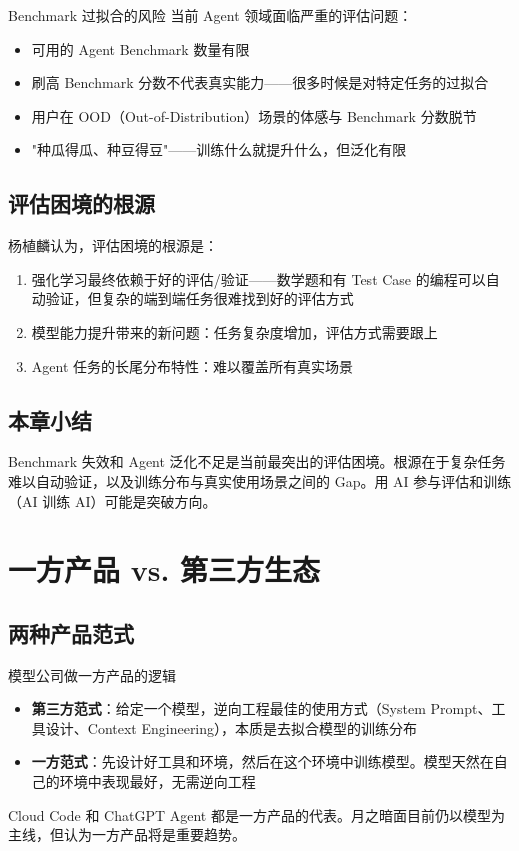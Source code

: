 \documentclass[a4paper]{article}
\begin{document}
\begin{warningbox}{Benchmark 过拟合的风险}
当前 Agent 领域面临严重的评估问题：
\begin{itemize}
    \item 可用的 Agent Benchmark 数量有限
    \item 刷高 Benchmark 分数不代表真实能力——很多时候是对特定任务的过拟合
    \item 用户在 OOD（Out-of-Distribution）场景的体感与 Benchmark 分数脱节
    \item "种瓜得瓜、种豆得豆"——训练什么就提升什么，但泛化有限
\end{itemize}
\end{warningbox}

\subsection{评估困境的根源}

杨植麟认为，评估困境的根源是：

\begin{enumerate}
    \item 强化学习最终依赖于好的评估/验证——数学题和有 Test Case 的编程可以自动验证，但复杂的端到端任务很难找到好的评估方式
    \item 模型能力提升带来的新问题：任务复杂度增加，评估方式需要跟上
    \item Agent 任务的长尾分布特性：难以覆盖所有真实场景
\end{enumerate}

\subsection{本章小结}

Benchmark 失效和 Agent 泛化不足是当前最突出的评估困境。根源在于复杂任务难以自动验证，以及训练分布与真实使用场景之间的 Gap。用 AI 参与评估和训练（AI 训练 AI）可能是突破方向。


\section{一方产品 vs. 第三方生态}

\subsection{两种产品范式}

\begin{importantbox}{模型公司做一方产品的逻辑}
\begin{itemize}
    \item \textbf{第三方范式}：给定一个模型，逆向工程最佳的使用方式（System Prompt、工具设计、Context Engineering），本质是去拟合模型的训练分布
    \item \textbf{一方范式}：先设计好工具和环境，然后在这个环境中训练模型。模型天然在自己的环境中表现最好，无需逆向工程
\end{itemize}
Cloud Code 和 ChatGPT Agent 都是一方产品的代表。月之暗面目前仍以模型为主线，但认为一方产品将是重要趋势。
\end{importantbox}
\end{document}
